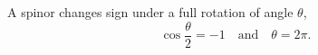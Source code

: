 \documentclass{article}
\begin{document}
A spinor changes sign under a full rotation of angle $\theta$,
\begin{equation}
\cos\frac{\theta}{2} = -1 \quad \text{and} \quad \theta = 2\pi .
\label{eq:full}
\end{equation}
\end{document}
